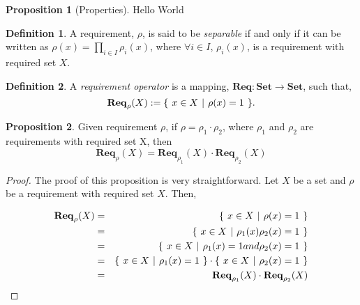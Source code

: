 \documentclass{article}
\theoremstyle{definition}
\newtheorem{definition}{Definition}[part]
\theoremstyle{remark}
\theoremstyle{definition}
\newtheorem{proposition}{Proposition}[section]
\newcommand{\reqop}[2]{\mathbf{Req}_{#1}(#2)}
\newcommand{\setbuild}[3]{
	\{\hspace{0.05in} 
	#1 \in #2 \hspace{0.05in} 
	| \hspace{0.05in}#3\hspace{0.05in}
	\}	
}
\begin{document}
            \begin{proposition}[Properties]

                Hello World

            \end{proposition}

            \begin{definition}
                A requirement, $\rho$, is said to be \emph{separable} if and only if it can be written as $\rho(x) = \prod_{i \in I}{\rho_{i}(x)}$, where $\forall i \in I$, $\rho_{i}(x)$, is a requirement with required set $X$.
            \end{definition}

            \begin{definition}
                A \emph{requirement operator} is a mapping, $\mathbf{Req}: \mathbf{Set} \rightarrow \mathbf{Set}$,
                such that,
                \[
                \reqop{\rho}{X} := \setbuild{x}{X}{\rho(x) = 1}.
                \]
            \end{definition}

            \begin{proposition}
                Given requirement $\rho$, if $\rho = \rho_{1}\cdot\rho_{2}$, where $\rho_{1}$ and $\rho_{2}$ are requirements with required set X, then
                \[
                \reqop{\rho}{X} = \reqop{\rho_{1}}{X}\cdot\reqop{\rho_{2}}{X}
                \]
            \end{proposition}

            \begin{proof}
                The proof of this proposition is very straightforward. Let $X$ be a set and $\rho$ be a requirement with required set $X$. Then,

                \begin{eqnarray}
                \reqop{\rho}{X} & = & \setbuild{x}{X}{\rho(x) = 1} \\
                                & = & \setbuild{x}{X}{\rho_{1}(x)\rho_{2}(x) = 1} \\
                                & = & \setbuild{x}{X}{\rho_{1}(x) = 1 and \rho_{2}(x) = 1} \\
                                & = & \setbuild{x}{X}{\rho_{1}(x) = 1}\cdot\setbuild{x}{X}{\rho_{2}(x) = 1} \\
                                & = & \reqop{\rho_{1}}{X}\cdot\reqop{\rho_{2}}{X}
                \end{eqnarray}
            \end{proof}
\end{document}

